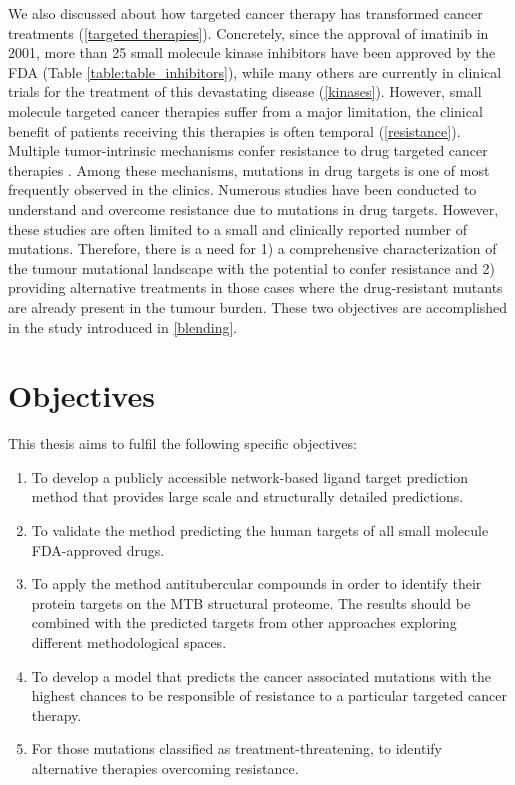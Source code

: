 \documentclass[11pt, b5paper,twoside]{tesi_upf}
\begin{document}
We also discussed about how targeted cancer therapy has transformed cancer treatments (\cref{targeted therapies}). Concretely, since the approval of imatinib in 2001, more than 25 small molecule kinase inhibitors have been approved by the FDA (Table \ref{table:table_inhibitors}), while many others are currently in clinical trials for the treatment of this devastating disease (\cref{kinases}). However, small molecule targeted cancer therapies suffer from a major limitation, the clinical benefit of patients receiving this therapies is often temporal (\cref{resistance}). Multiple tumor-intrinsic mechanisms confer resistance to drug targeted cancer therapies \cite{Holohan2013}. Among these mechanisms, mutations in drug targets is one of most frequently observed in the clinics. Numerous studies have been conducted to understand and overcome resistance due to mutations in drug targets. However, these studies are often limited to a small and clinically reported number of mutations. Therefore, there is a need for 1) a comprehensive characterization of the tumour mutational landscape with the potential to confer resistance and 2) providing alternative treatments in those cases where the drug-resistant mutants are already present in the tumour burden. These two objectives are accomplished in the study introduced in \cref{blending}. 

\section{Objectives}


This thesis aims to fulfil the following specific objectives: 


\begin{enumerate}[label=\roman*]

\item To develop a publicly accessible network-based ligand target prediction method that provides large scale and structurally detailed predictions. 

\item To validate the method predicting the human targets of all small molecule FDA-approved drugs. 

\item To apply the method antitubercular compounds in order to identify their protein targets on the MTB structural proteome. The results should be combined with the predicted targets from other approaches exploring different methodological spaces.  
 
\item To develop a model that predicts the cancer associated mutations with the highest chances to be responsible of resistance to a  particular targeted cancer therapy. 

\item For those mutations classified as treatment-threatening, to identify alternative therapies overcoming resistance.


\end{enumerate}
\end{document}
